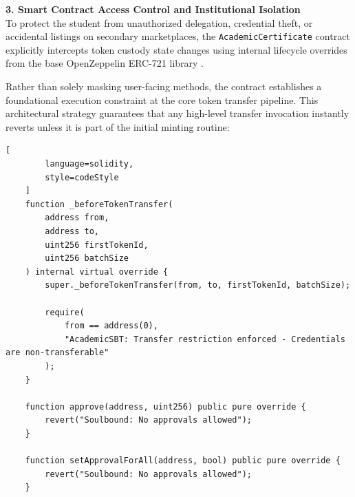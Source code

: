 \textbf{3. Smart Contract Access Control and Institutional Isolation}\\

To protect the student from unauthorized delegation, credential theft, or accidental listings on secondary marketplaces, the \texttt{AcademicCertificate} contract explicitly intercepts token custody state changes using internal lifecycle overrides from the base OpenZeppelin ERC-721 library \cite{gasandfeesetheweb}.

Rather than solely masking user-facing methods, the contract establishes a foundational execution constraint at the core token transfer pipeline. This architectural strategy guarantees that any high-level transfer invocation instantly reverts unless it is part of the initial minting routine:

\begin{lstlisting}[
        language=solidity,
        style=codeStyle
    ]
    function _beforeTokenTransfer(
        address from,
        address to,
        uint256 firstTokenId,
        uint256 batchSize
    ) internal virtual override {
        super._beforeTokenTransfer(from, to, firstTokenId, batchSize);

        require(
            from == address(0),
            "AcademicSBT: Transfer restriction enforced - Credentials are non-transferable"
        );
    }

    function approve(address, uint256) public pure override {
        revert("Soulbound: No approvals allowed");
    }

    function setApprovalForAll(address, bool) public pure override {
        revert("Soulbound: No approvals allowed");
    }
\end{lstlisting}

